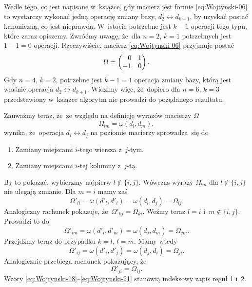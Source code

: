 \documentclass[a4paper,11pt]{article}
\begin{document}
Wedle tego, co jest napisane w~książce, gdy macierz jest formie
\eqref{eq:Wojtynski-06} to wystarczy wykonać jedną operację zmiany bazy,
$d_{ 2 } \leftrightarrow d_{ k + 1 }$, by uzyskać postać kanoniczną, co jest nieprawdą.
W~istocie potrzebne jest $k - 1$ operacji tego typu, które zaraz opiszemy.
Zwróćmy uwagę, że~dla $n = 2$, $k = 1$ potrzebnych jest $1 - 1 = 0$
operacji. Rzeczywiście, macierz \eqref{eq:Wojtynski-06} przyjmuje postać
\begin{equation}
  \label{eq:Wojtynski-16}
  \Omega =
  \begin{pmatrix}
    \hphantom{-} 0 & 1 \\
    -1 & 0
  \end{pmatrix}.
\end{equation}
Gdy $n = 4$, $k = 2$, potrzebne jest $k - 1 = 1$ operacja zmiany bazy,
którą jest właśnie operacja $d_{ 2 } \leftrightarrow d_{ k + 1 }$. Widzimy więc, że~dopiero
dla $n = 6$, $k = 3$ przedstawiony w~książce algorytm nie prowadzi
do pożądanego rezultatu.

Zauważmy teraz, że~ze względu na definicję wyrazów macierzy $\Omega$
\begin{equation}
  \label{eq:Wojtynski-17}
  \Omega_{ l m } = \omega( d_{ l }, d_{ m } ),
\end{equation}
wynika, że~operacja $d_{ i } \leftrightarrow d_{ j }$ na poziomie macierzy sprowadza~się do
\begin{enumerate}

\item Zamiany miejscami $i$-tego wiersza z~$j$-tym.

\item Zamiany miejscami $i$-tej kolumny z~$j$-tą.

\end{enumerate}
By to pokazać, wybierzmy najpierw $l \notin \{ i, j \}$. Wówczas wyrazy
$\Omega_{ l m }$ dla $l \notin \{ i, j \}$ nie ulegają zmianie. Dla $m = i$ mamy zaś
\begin{equation}
  \label{eq:Wojtynski-18}
  \Omega'_{ l i } = \omega( d'_{ l }, d'_{ i } ) = \omega( d_{ l }, d_{ j } ) =
  \Omega_{ l j }.
\end{equation}
Analogiczny rachunek pokazuje, że~$\Omega'_{ k j } = \Omega_{ k i }$. Weźmy teraz
$l = i$ i~$m \notin \{ i, j \}$. Prowadzi to do
\begin{equation}
  \label{eq:Wojtynski-19}
  \Omega'_{ i m } = \omega( d'_{ i }, d'_{ m } ) = \omega( d_{ j }, d_{ m } ) =
  \Omega_{ j m }.
\end{equation}
Przejdźmy teraz do przypadku $k = l$, $l = m$. Mamy wtedy
\begin{equation}
  \label{eq:Wojtynski-20}
  \Omega'_{ i j } = \omega( d'_{ i }, d'_{ j } ) = \omega( d_{ j }, d_{ i } ) =
  \Omega_{ j i }.
\end{equation}
Analogicznie przebiega rachunek pokazujący, że
\begin{equation}
  \label{eq:Wojtynski-21}
  \Omega'_{ j i } = \Omega_{ i j }.
\end{equation}
Wzory \eqref{eq:Wojtynski-18}--\eqref{eq:Wojtynski-21} stanowią indeksowy
zapis reguł 1 i~2.
\end{document}
